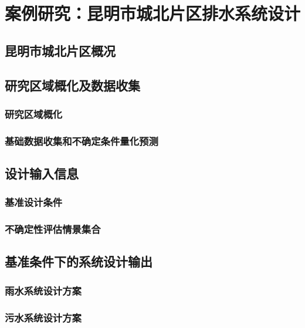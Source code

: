 \documentclass[degree=doctor]{thuthesis}
\begin{document}
\clearpage
\setcounter{page}{109}
\chapter{案例研究：昆明市城北片区排水系统设计}
\section{昆明市城北片区概况}

\clearpage
\setcounter{page}{110}
\section{研究区域概化及数据收集}
\subsection{研究区域概化}

\clearpage
\setcounter{page}{111}
\subsection{基础数据收集和不确定条件量化预测}

\clearpage
\setcounter{page}{115}
\section{设计输入信息}
\subsection{基准设计条件}

\clearpage
\setcounter{page}{120}
\subsection{不确定性评估情景集合}
\section{基准条件下的系统设计输出}
\subsection{雨水系统设计方案}

\clearpage
\setcounter{page}{124}
\subsection{污水系统设计方案}

\clearpage
\setcounter{page}{128}
\end{document}
